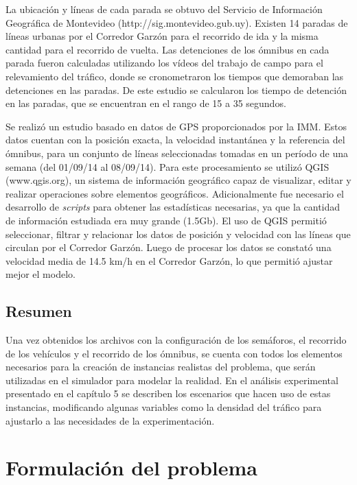 La ubicación y líneas de cada parada se obtuvo del Servicio de Información Geográfica de Montevideo (http://sig.montevideo.gub.uy). Existen 14 paradas de líneas urbanas por el Corredor Garzón para el recorrido de ida y la misma cantidad para el recorrido de vuelta. Las detenciones de los ómnibus en cada parada fueron calculadas utilizando los vídeos del trabajo de campo para el relevamiento del tráfico, donde se cronometraron los tiempos que demoraban las detenciones en las paradas. De este estudio se calcularon los tiempo de detención en las paradas, que se encuentran en el rango de 15 a 35 segundos.

Se realizó un estudio basado en datos de GPS proporcionados por la IMM. Estos datos cuentan con la posición exacta, la velocidad instantánea y la referencia del ómnibus, para un conjunto de líneas seleccionadas tomadas en un período de una semana (del 01/09/14 al 08/09/14). 
Para este procesamiento se utilizó QGIS (www.qgis.org), un sistema de información geográfico capaz de visualizar, editar y realizar operaciones sobre elementos geográficos. Adicionalmente fue necesario el desarrollo de \emph{scripts} para obtener las estadísticas necesarias, ya que la cantidad de información estudiada era muy grande (1.5Gb). El uso de QGIS permitió seleccionar, filtrar y relacionar los datos de posición y velocidad con las líneas que circulan por el Corredor Garzón. Luego de procesar los datos se constató una velocidad media de 14.5 km/h en el Corredor Garzón, lo que permitió ajustar mejor el modelo. 


\subsection{Resumen}

Una vez obtenidos los archivos con la configuración de los semáforos, el recorrido de los vehículos y el recorrido de los ómnibus, se cuenta con todos los elementos necesarios para la creación de instancias realistas del problema, que serán utilizadas en el simulador para modelar la realidad.  En el análisis experimental presentado en el capítulo 5 se describen los escenarios que hacen uso de estas instancias, modificando algunas variables como la densidad del tráfico para ajustarlo a las necesidades de la experimentación.

\section{Formulación del problema}


